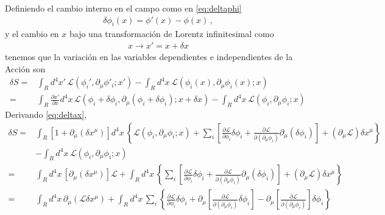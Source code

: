 Definiendo el cambio interno en el campo como en \eqref{eq:deltaphi}
\begin{align}
  \delta\phi_i(x)=\phi'(x)-\phi(x)\,,
\end{align}
y el cambio en $x$ bajo una transformación de Lorentz infinitesimal como
\begin{align}
\label{eq:deltax}
  x\to x'=x+\delta x
\end{align}
tenemos que la variación en las variables dependientes e independientes de la Acción son
\begin{align}
   \delta S=&\int_{R}d^4x'\,\mathcal{L} \left( \phi_{i}',\partial_{\mu}\phi'_i;x' \right)- \int_{R}d^4x\,\mathcal{L} \left( \phi_{i}(x),\partial_{\mu}\phi_i(x);x \right) \nonumber\\
     =&\int_{R}\frac{\partial x'}{\partial x}d^4x\,\mathcal{L} \left( \phi_{i}+\delta\phi_i,\partial_{\mu}(\phi_i+\delta\phi_i);x+\delta x \right)- \int_{R}d^4x\,\mathcal{L} \left( \phi_{i},\partial_{\mu}\phi_i;x \right)\,
\end{align}
Derivando \eqref{eq:deltax},
\begin{align}
     \delta S =&\int_{R} \left[ 1+\partial_{\mu} \left( \delta x^{\mu}  \right)\right]  d^4x\,\left\{ \mathcal{L}(\phi_i,\partial_{\mu}\phi_i;x)+\sum_i \left[ \frac{\partial\mathcal{L}}{\partial\phi_i}\delta\phi_{i} +\frac{\partial\mathcal{L}}{\partial(\partial_{\mu}\phi_i)}\partial_{\mu}(\delta\phi_{i}) \right]+\left( \partial_{\mu}\mathcal{L} \right)\delta x^{\mu} \right\}\nonumber\\
      &- \int_{R}d^4x\,\mathcal{L} \left( \phi_{i},\partial_{\mu}\phi_i;x \right) \nonumber\\
     =&\int_{R} d^4x\,\left[ \partial_{\mu} \left( \delta x^{\mu}  \right)\right] \mathcal{L} + \int_{R}d^4x\,\left\{\sum_i \left[ \frac{\partial\mathcal{L}}{\partial\phi_i}\delta\phi_{i} +\frac{\partial\mathcal{L}}{\partial(\partial_{\mu}\phi_i)}\partial_{\mu}(\delta\phi_{i}) \right]+\left( \partial_{\mu}\mathcal{L} \right)\delta x^{\mu} \right\}\nonumber\\
     =&\int_{R} d^4x\,\partial_{\mu} \left(\mathcal{L} \delta x^{\mu}  \right)  + \int_{R}d^4x\,\sum_i \left\{ \frac{\partial\mathcal{L}}{\partial\phi_i}\delta\phi_{i} +\partial_{\mu} \left[ \frac{\partial\mathcal{L}}{\partial(\partial_{\mu}\phi_i)}\delta\phi_{i} \right]-\partial_{\mu} \left[ \frac{\partial\mathcal{L}}{\partial(\partial_{\mu}\phi_i)}\right]\delta\phi_{i}  \right\}\nonumber\\
\end{align}

